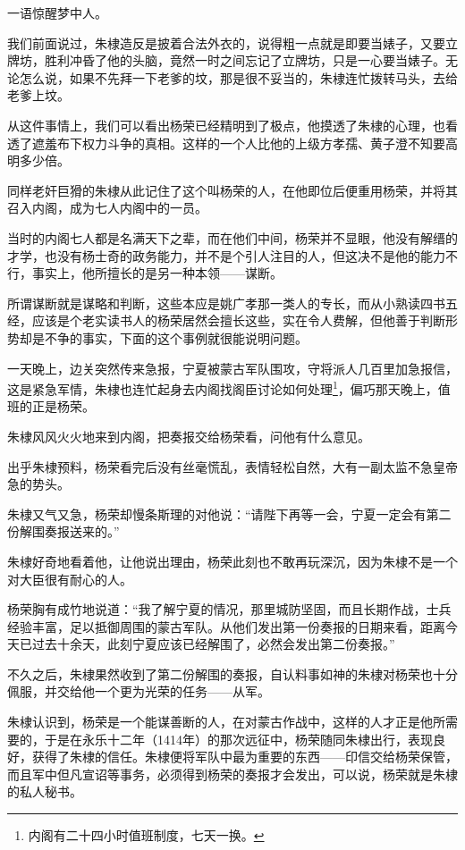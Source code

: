\begin{multicols}{\theparacolNo}
一语惊醒梦中人。

我们前面说过，朱棣造反是披着合法外衣的，说得粗一点就是即要当婊子，又要立牌坊，胜利冲昏了他的头脑，竟然一时之间忘记了立牌坊，只是一心要当婊子。无论怎么说，如果不先拜一下老爹的坟，那是很不妥当的，朱棣连忙拨转马头，去给老爹上坟。

从这件事情上，我们可以看出杨荣已经精明到了极点，他摸透了朱棣的心理，也看透了遮羞布下权力斗争的真相。这样的一个人比他的上级方孝孺、黄子澄不知要高明多少倍。

同样老奸巨猾的朱棣从此记住了这个叫杨荣的人，在他即位后便重用杨荣，并将其召入内阁，成为七人内阁中的一员。

当时的内阁七人都是名满天下之辈，而在他们中间，杨荣并不显眼，他没有解缙的才学，也没有杨士奇的政务能力，并不是个引人注目的人，但这决不是他的能力不行，事实上，他所擅长的是另一种本领——谋断。

所谓谋断就是谋略和判断，这些本应是姚广孝那一类人的专长，而从小熟读四书五经，应该是个老实读书人的杨荣居然会擅长这些，实在令人费解，但他善于判断形势却是不争的事实，下面的这个事例就很能说明问题。

一天晚上，边关突然传来急报，宁夏被蒙古军队围攻，守将派人几百里加急报信，这是紧急军情，朱棣也连忙起身去内阁找阁臣讨论如何处理\footnote{内阁有二十四小时值班制度，七天一换。}，偏巧那天晚上，值班的正是杨荣。

朱棣风风火火地来到内阁，把奏报交给杨荣看，问他有什么意见。

出乎朱棣预料，杨荣看完后没有丝毫慌乱，表情轻松自然，大有一副太监不急皇帝急的势头。

朱棣又气又急，杨荣却慢条斯理的对他说：“请陛下再等一会，宁夏一定会有第二份解围奏报送来的。”

朱棣好奇地看着他，让他说出理由，杨荣此刻也不敢再玩深沉，因为朱棣不是一个对大臣很有耐心的人。

杨荣胸有成竹地说道：“我了解宁夏的情况，那里城防坚固，而且长期作战，士兵经验丰富，足以抵御周围的蒙古军队。从他们发出第一份奏报的日期来看，距离今天已过去十余天，此刻宁夏应该已经解围了，必然会发出第二份奏报。”

不久之后，朱棣果然收到了第二份解围的奏报，自认料事如神的朱棣对杨荣也十分佩服，并交给他一个更为光荣的任务——从军。

朱棣认识到，杨荣是一个能谋善断的人，在对蒙古作战中，这样的人才正是他所需要的，于是在永乐十二年（1414年）的那次远征中，杨荣随同朱棣出行，表现良好，获得了朱棣的信任。朱棣便将军队中最为重要的东西——印信交给杨荣保管，而且军中但凡宣诏等事务，必须得到杨荣的奏报才会发出，可以说，杨荣就是朱棣的私人秘书。


\end{multicols}
